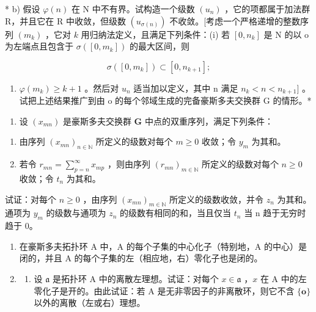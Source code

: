 * b) 假设 \(\varphi(n)\) 在 N 中不有界。试构造一个级数 \((u_n)\) ，它的项都属于加法群 R，并且它在 R 中收敛，但级数 \((u_{\sigma(n)})\) 不收敛。{[}考虑一个严格递增的整数序列 \((m_k)\) ，它对 \(k\) 用归纳法定义，且满足下列条件：(i) 若 \([0, n_k]\) 是 N 的以 o 为左端点且包含于 \(\sigma([0, m_k])\) 的最大区间，则

\[
\sigma ([ 0, m _ {k} ]) \subset [ 0, n _ {k + 1} ];
\]

\begin{enumerate}
\def\labelenumi{(\roman{enumi})}
\setcounter{enumi}{1}
\tightlist
\item
  \(\varphi(m_k) \geqslant k + 1\) 。然后对 \(u_n\) 适当加以定义，其中 n 满足 \(n_k < n < n_{k+1}]\) 。试把上述结果推广到由 o 的每个邻域生成的完备豪斯多夫交换群 G 的情形。*
\end{enumerate}

\begin{enumerate}
\def\labelenumi{\arabic{enumi})}
\setcounter{enumi}{6}
\tightlist
\item
  设 \((x_{mn})\) 是豪斯多夫交换群 \(\mathbf{G}\) 中点的双重序列，满足下列条件：
\end{enumerate}

\begin{enumerate}
\def\labelenumi{(\alph{enumi})}
\item
  由序列 \((x_{mn})_{n\in \mathbb{N}}\) 所定义的级数对每个 \(m\geqslant 0\) 收敛；令 \(y_{m}\) 为其和。
\item
  若令 \(r_{mn} = \sum_{p=n}^{\infty} x_{mp}\) ，则由序列 \((r_{mn})_{m \in \mathbb{N}}\) 所定义的级数对每个 \(n \geqslant 0\) 收敛；令 \(t_n\) 为其和。
\end{enumerate}

试证：对每个 \(n \geqslant 0\) ，由序列 \((x_{mn})_{m \in \mathbb{N}}\) 所定义的级数收敛，并令 \(z_{n}\) 为其和。通项为 \(y_{m}\) 的级数与通项为 \(z_{n}\) 的级数有相同的和，当且仅当 \(t_{n}\) 当 n 趋于无穷时趋于 0。

\BourbakiExerciseGroup

\begin{enumerate}
\def\labelenumi{\arabic{enumi})}
\item
  在豪斯多夫拓扑环 A 中，A 的每个子集的中心化子（特别地，A 的中心）是闭的，并且 A 的每个子集的左（相应地，右）零化子也是闭的。
\item
  \begin{enumerate}
  \def\labelenumii{\alph{enumii})}
  \tightlist
  \item
    设 \(\mathfrak{a}\) 是拓扑环 A 中的离散左理想。试证：对每个 \(x \in \mathfrak{a}\) ，\(x\) 在 A 中的左零化子是开的。由此试证：若 A 是无非零因子的非离散环，则它不含 \(\{\mathbf{o}\}\) 以外的离散（左或右）理想。
  \end{enumerate}
\end{enumerate}

